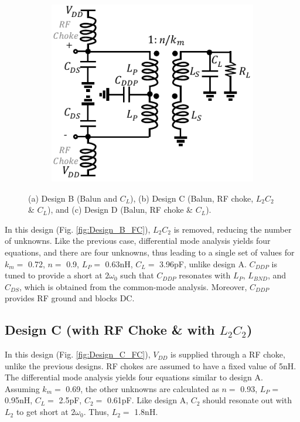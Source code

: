 \documentclass[conference]{IEEEtran}
\begin{document}
\begin{figure}[!t]
\begin{subfigure}{0.24\textwidth}
\includegraphics[width=1\textwidth]{Images/Design/Design_D_FC.pdf}
\caption{}
\label{fig:Design_D_FC}
\end{subfigure}
\caption{(a) Design B (Balun and $C_L$), (b) Design C (Balun, RF choke, $L_2C_2$ \& $C_L$), and (c) Design D (Balun, RF choke \& $C_L$).}
\label{fig:Design_B_C_D}
\vspace{-0.25in}
\end{figure}

In this design (Fig. \ref{fig:Design_B_FC}), $L_2C_2$ is removed, reducing the number of unknowns. Like the previous case, differential mode analysis yields four equations, and there are four unknowns, thus leading to a single set of values for $k_m=$ 0.72, $n =$ 0.9, $L_P =$ 0.63nH, $C_L =$ 3.96pF, unlike design A. $C_{DDP}$ is tuned to provide a short at $2\omega_0$ such that $C_{DDP}$ resonates with $L_P$, $L_{BND}$, and $C_{DS}$, which is obtained from the common-mode analysis. Moreover, $C_{DDP}$ provides RF ground and blocks DC.

\subsection{Design C (with RF Choke \& with $L_2C_2$)}
In this design (Fig. \ref{fig:Design_C_FC}), $V_{DD}$ is supplied through a RF choke, unlike the previous designs. RF chokes are assumed to have a fixed value of 5nH. The differential mode analysis yields four equations similar to design A. Assuming $k_m=$ 0.69, the other unknowns are calculated as $n =$ 0.93, $L_P =$ 0.95nH, $C_L =$ 2.5pF, $C_2 =$ 0.61pF.
Like design A, $C_2$ should resonate out with $L_2$ to get short at $2\omega_0$. Thus, $L_2 =$ 1.8nH. 
\end{document}

